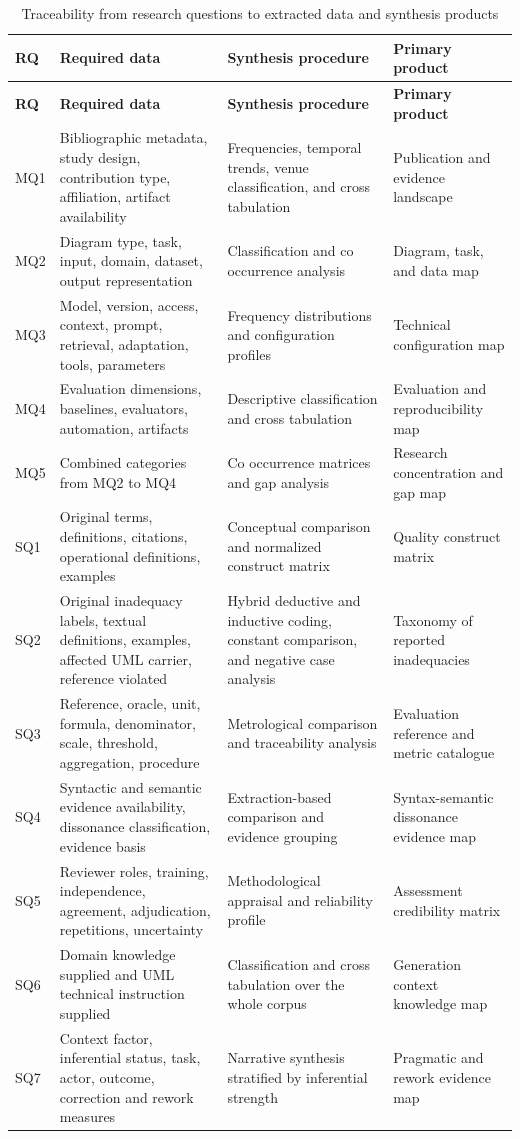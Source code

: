 \begin{longtable}{@{}p{} p{} p{} p{}@{}}
\caption{Traceability from research questions to extracted data and synthesis products}
\label{tab:protocol_rq_traceability}\\
\toprule
\textbf{RQ} & \textbf{Required data} & \textbf{Synthesis procedure} & \textbf{Primary product} \\
\midrule
\endfirsthead
\toprule
\textbf{RQ} & \textbf{Required data} & \textbf{Synthesis procedure} & \textbf{Primary product} \\
\midrule
\endhead
MQ1 & Bibliographic metadata, study design, contribution type, affiliation, artifact availability & Frequencies, temporal trends, venue classification, and cross tabulation & Publication and evidence landscape \\
MQ2 & Diagram type, task, input, domain, dataset, output representation & Classification and co occurrence analysis & Diagram, task, and data map \\
MQ3 & Model, version, access, context, prompt, retrieval, adaptation, tools, parameters & Frequency distributions and configuration profiles & Technical configuration map \\
MQ4 & Evaluation dimensions, baselines, evaluators, automation, artifacts & Descriptive classification and cross tabulation & Evaluation and reproducibility map \\
MQ5 & Combined categories from MQ2 to MQ4 & Co occurrence matrices and gap analysis & Research concentration and gap map \\
SQ1 & Original terms, definitions, citations, operational definitions, examples & Conceptual comparison and normalized construct matrix & Quality construct matrix \\
SQ2 & Original inadequacy labels, textual definitions, examples, affected UML carrier, reference violated & Hybrid deductive and inductive coding, constant comparison, and negative case analysis & Taxonomy of reported inadequacies \\
SQ3 & Reference, oracle, unit, formula, denominator, scale, threshold, aggregation, procedure & Metrological comparison and traceability analysis & Evaluation reference and metric catalogue \\
SQ4 & Syntactic and semantic evidence availability, dissonance classification, evidence basis & Extraction-based comparison and evidence grouping & Syntax-semantic dissonance evidence map \\
SQ5 & Reviewer roles, training, independence, agreement, adjudication, repetitions, uncertainty & Methodological appraisal and reliability profile & Assessment credibility matrix \\
SQ6 & Domain knowledge supplied and UML technical instruction supplied & Classification and cross tabulation over the whole corpus & Generation context knowledge map \\
SQ7 & Context factor, inferential status, task, actor, outcome, correction and rework measures & Narrative synthesis stratified by inferential strength & Pragmatic and rework evidence map \\
\bottomrule
\end{longtable}

